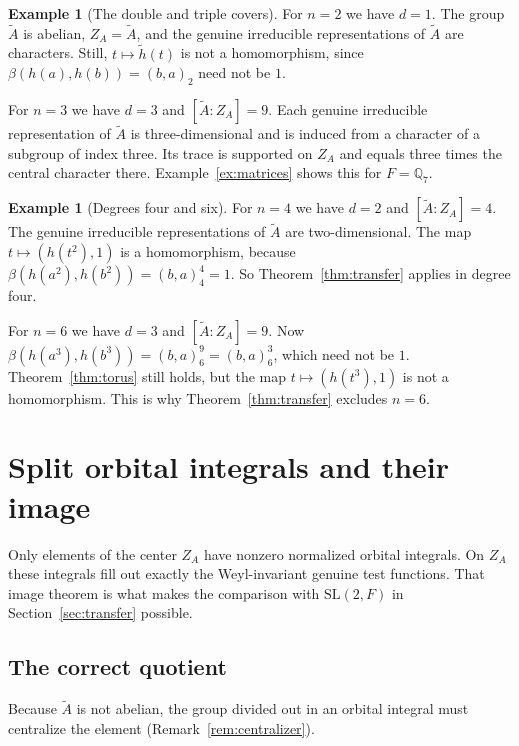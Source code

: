 \documentclass[12pt,letterpaper]{article}
\numberwithin{equation}{section}
\theoremstyle{plain}
\theoremstyle{definition}
\newtheorem{example}[theorem]{Example}
\theoremstyle{remark}
\newcommand{\At}{\widetilde A}
\newcommand{\hl}{\tilde h}
\newcommand{\Qq}{\mathbb Q}
\newcommand{\ZA}{Z_A}
\newcommand{\SL}{\mathrm{SL}}
\begin{document}
\begin{example}[The double and triple covers]\label{ex:two-three}
For $n=2$ we have $d=1$. The group $\At$ is abelian, $\ZA=\At$, and
the genuine irreducible representations of $\At$ are characters. Still,
$t\mapsto\hl(t)$ is not a homomorphism, since
$\beta(h(a),h(b))=(b,a)_2$ need not be $1$.

For $n=3$ we have $d=3$ and $[\At:\ZA]=9$. Each genuine irreducible
representation of $\At$ is three-dimensional and is induced from a
character of a subgroup of index three. Its trace is supported on
$\ZA$ and equals three times the central character there.
Example~\ref{ex:matrices} shows this for $F=\Qq_7$.
\end{example}

\begin{example}[Degrees four and six]\label{ex:four-six}
For $n=4$ we have $d=2$ and $[\At:\ZA]=4$. The genuine irreducible
representations of $\At$ are two-dimensional. The map
$t\mapsto(h(t^2),1)$ is a homomorphism, because
$\beta(h(a^2),h(b^2))=(b,a)_4^4=1$. So Theorem~\ref{thm:transfer}
applies in degree four.

For $n=6$ we have $d=3$ and $[\At:\ZA]=9$. Now
$\beta(h(a^3),h(b^3))=(b,a)_6^9=(b,a)_6^3$, which need not be $1$.
Theorem~\ref{thm:torus} still holds, but the map
$t\mapsto(h(t^3),1)$ is not a homomorphism. This is why
Theorem~\ref{thm:transfer} excludes $n=6$.
\end{example}

\section{Split orbital integrals and their image}\label{sec:orbital}

Only elements of the center $\ZA$ have nonzero normalized orbital
integrals. On $\ZA$ these integrals fill out exactly the Weyl-invariant
genuine test functions. That image theorem is what makes the comparison
with $\SL(2,F)$ in Section~\ref{sec:transfer} possible.

\subsection*{The correct quotient}

Because $\At$ is not abelian, the group divided out in an orbital
integral must centralize the element (Remark~\ref{rem:centralizer}).
\end{document}

